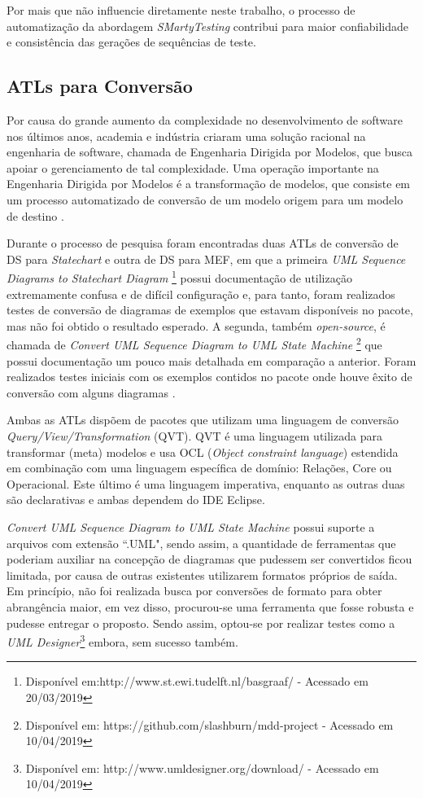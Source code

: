 Por mais que não influencie diretamente neste trabalho, o processo de automatização da abordagem \textit{SMartyTesting} contribui para maior confiabilidade e consistência das gerações de sequências de teste. 
\subsection{ATLs para Conversão}
Por causa do grande aumento da complexidade no desenvolvimento de software nos últimos anos, academia e indústria criaram uma solução racional na engenharia de software, chamada de Engenharia Dirigida por Modelos, que busca apoiar o gerenciamento de tal complexidade. Uma operação importante na Engenharia Dirigida por Modelos é a transformação de modelos, que consiste em um processo automatizado de conversão de um modelo origem para um modelo de destino \cite{allilaire2006atl}.

Durante o processo de pesquisa foram encontradas duas ATLs de conversão de DS para \textit{Statechart} e outra de DS para MEF, em que a primeira \textit{UML Sequence Diagrams to Statechart Diagram} \footnote[1]{Disponível em:http://www.st.ewi.tudelft.nl/basgraaf/ - Acessado em 20/03/2019} possui documentação de utilização extremamente confusa e de difícil configuração e, para tanto, foram realizados testes de conversão de diagramas de exemplos que estavam disponíveis no pacote, mas não foi obtido o resultado esperado. A segunda, também \textit{open-source}, é chamada de \textit{Convert UML Sequence Diagram to UML State Machine} \footnote[2]{Disponível em: https://github.com/slashburn/mdd-project - Acessado em 10/04/2019} que possui documentação um pouco mais detalhada em comparação a anterior. Foram realizados testes iniciais com os exemplos contidos no pacote onde houve êxito de conversão com alguns diagramas \cite{hennicker2007activity}.

Ambas as ATLs dispõem de pacotes que utilizam uma linguagem de conversão \textit{Query/View/Transformation} (QVT). QVT é uma linguagem utilizada para transformar (meta) modelos e usa OCL (\textit{Object constraint language}) estendida em combinação com uma linguagem específica de domínio: Relações, Core ou Operacional. Este último é uma linguagem imperativa, enquanto as outras duas são declarativas e ambas dependem do IDE Eclipse.

\textit{Convert UML Sequence Diagram to UML State Machine} possui suporte a arquivos com extensão ``.UML", sendo assim, a quantidade de ferramentas que poderiam auxiliar na concepção de diagramas que pudessem ser convertidos ficou limitada, por causa de outras existentes utilizarem formatos próprios de saída. Em princípio, não foi realizada busca por conversões de formato para obter abrangência maior, em vez disso, procurou-se uma ferramenta que fosse robusta e pudesse entregar o proposto. Sendo assim, optou-se por realizar testes como a \textit{UML Designer}\footnote[3]{Disponível em: http://www.umldesigner.org/download/ - Acessado em 10/04/2019} embora, sem sucesso também.


